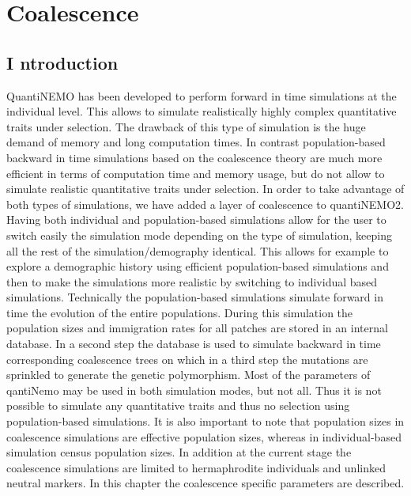 \documentclass[letterpaper,12pt,oneside]{book}
\begin{document}
\chapter{Coalescence}\label{chap:Coalescence}
\section{I ntroduction}
QuantiNEMO has been developed to perform forward in time simulations at the individual level. This allows to simulate realistically highly complex quantitative traits under selection. The drawback of this type of simulation is the huge demand of memory and long computation times. In contrast population-based backward in time simulations based on the coalescence theory are much more efficient in terms of computation time and memory usage, but do not allow to simulate realistic quantitative traits under selection. In order to take advantage of both types of simulations, we have added a layer of coalescence to quantiNEMO2. Having both individual and population-based simulations allow for the user to switch easily the simulation mode depending on the type of simulation, keeping all the rest of the simulation/demography identical. This allows for example to explore a demographic history using efficient population-based simulations and then to make the simulations more realistic by switching to individual based simulations. Technically the population-based simulations simulate forward in time the evolution of the entire populations. During this simulation the population sizes and immigration rates for all patches are stored in an internal database. In a second step the database is used to simulate backward in time corresponding coalescence trees on which in a third step the mutations are sprinkled to generate the genetic polymorphism.
Most of the parameters of qantiNemo may be used in both simulation modes, but not all. Thus it is not possible to simulate any quantitative traits and thus no selection using population-based simulations. It is also important to note that population sizes in coalescence simulations are effective population sizes, whereas in individual-based simulation census population sizes. In addition at the current stage the coalescence simulations are limited to hermaphrodite individuals and unlinked neutral markers. In this chapter the coalescence specific parameters are described.
\end{document}
